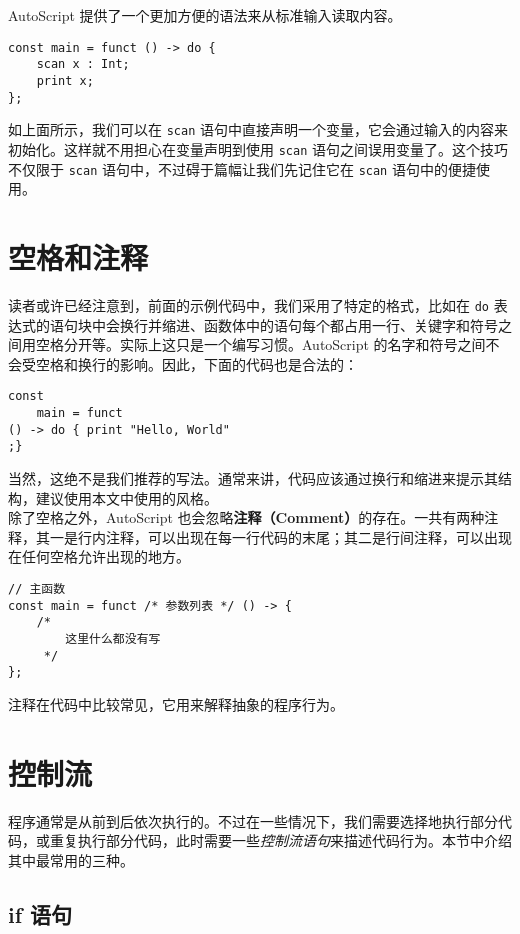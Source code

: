 AutoScript 提供了一个更加方便的语法来从标准输入读取内容。

\begin{lstlisting}
const main = funct () -> do {
    scan x : Int;
    print x;
};
\end{lstlisting}

如上面所示，我们可以在 \lstinline!scan! 语句中直接声明一个变量，它会通过输入的内容来初始化。这样就不用担心在变量声明到使用 \lstinline!scan! 语句之间误用变量了。这个技巧不仅限于 \lstinline!scan! 语句中，不过碍于篇幅让我们先记住它在 \lstinline!scan! 语句中的便捷使用。


\section{空格和注释}

读者或许已经注意到，前面的示例代码中，我们采用了特定的格式，比如在 \lstinline!do! 表达式的语句块中会换行并缩进、函数体中的语句每个都占用一行、关键字和符号之间用空格分开等。实际上这只是一个编写习惯。AutoScript 的名字和符号之间不会受空格和换行的影响。因此，下面的代码也是合法的：

\begin{lstlisting}
const
    main = funct
() -> do { print "Hello, World"
;}
\end{lstlisting}

当然，这绝不是我们推荐的写法。通常来讲，代码应该通过换行和缩进来提示其结构，建议使用本文中使用的风格。 \\

除了空格之外，AutoScript 也会忽略\textbf{注释（Comment）}的存在。一共有两种注释，其一是行内注释，可以出现在每一行代码的末尾；其二是行间注释，可以出现在任何空格允许出现的地方。

\begin{lstlisting}
// 主函数
const main = funct /* 参数列表 */ () -> {
    /*
        这里什么都没有写
     */
};
\end{lstlisting}

注释在代码中比较常见，它用来解释抽象的程序行为。


\section{控制流}

程序通常是从前到后依次执行的。不过在一些情况下，我们需要选择地执行部分代码，或重复执行部分代码，此时需要一些\emph{控制流语句}来描述代码行为。本节中介绍其中最常用的三种。

\subsection{if 语句}

